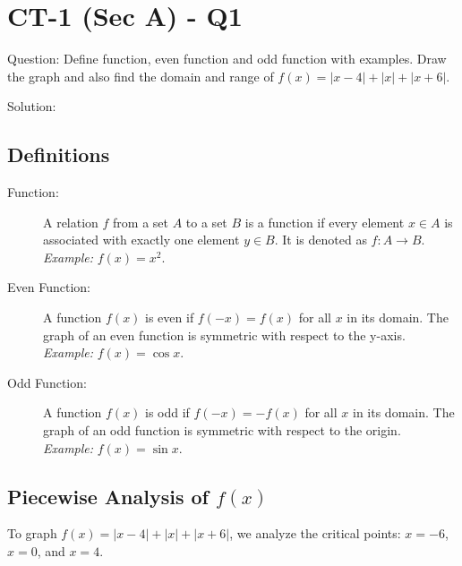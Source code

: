 \documentclass[11pt, a4paper]{article}
\begin{document}

\section*{CT-1 (Sec A) - Q1}

Question:
Define function, even function and odd function with examples. Draw the graph and also find the domain and range of $f(x) = |x - 4| + |x| + |x + 6|$.

Solution:

\subsection*{Definitions}
\begin{description}
    \item[Function:] A relation $f$ from a set $A$ to a set $B$ is a function if every element $x \in A$ is associated with exactly one element $y \in B$. It is denoted as $f: A \to B$. \\
    \textit{Example:} $f(x) = x^2$.
    \item[Even Function:] A function $f(x)$ is even if $f(-x) = f(x)$ for all $x$ in its domain. The graph of an even function is symmetric with respect to the y-axis. \\
    \textit{Example:} $f(x) = \cos x$.
    \item[Odd Function:] A function $f(x)$ is odd if $f(-x) = -f(x)$ for all $x$ in its domain. The graph of an odd function is symmetric with respect to the origin. \\
    \textit{Example:} $f(x) = \sin x$.
\end{description}

\subsection*{Piecewise Analysis of $f(x)$}
To graph $f(x) = |x - 4| + |x| + |x + 6|$, we analyze the critical points: $x = -6$, $x = 0$, and $x = 4$.
\end{document}
